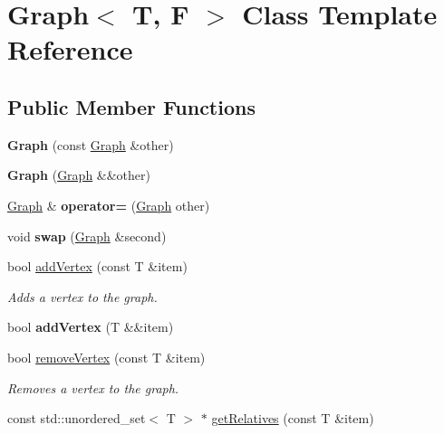 \hypertarget{class_graph}{}\section{Graph$<$ T, F $>$ Class Template Reference}
\label{class_graph}
\subsection*{Public Member Functions}
\begin{DoxyCompactItemize}
\item 
\mbox{\label{class_graph_a39aa3fc244acb59caab8ead87a490b08}} 
{\bfseries Graph} (const \hyperlink{class_graph}{Graph} \&other)
\item 
\mbox{\label{class_graph_adcc98abcaffd854bae4473287c0ec185}} 
{\bfseries Graph} (\hyperlink{class_graph}{Graph} \&\&other)
\item 
\mbox{\label{class_graph_a36fc23acaf0e5e89d9f7f54144b3f8c0}} 
\hyperlink{class_graph}{Graph} \& {\bfseries operator=} (\hyperlink{class_graph}{Graph} other)
\item 
\mbox{\label{class_graph_a427b02545efdf010462925ad5ff05726}} 
void {\bfseries swap} (\hyperlink{class_graph}{Graph} \&second)
\item 
bool \hyperlink{class_graph_a0d9a2a945cb00f2600f26ad63a4828d6}{add\+Vertex} (const T \&item)
\begin{DoxyCompactList}\small\item\em Adds a vertex to the graph. \end{DoxyCompactList}\item 
\mbox{\label{class_graph_ac65b5e08820fafb280c55bdce732f19a}} 
bool {\bfseries add\+Vertex} (T \&\&item)
\item 
bool \hyperlink{class_graph_ab60cdf74dfbd8c7682b760338fb8a952}{remove\+Vertex} (const T \&item)
\begin{DoxyCompactList}\small\item\em Removes a vertex to the graph. \end{DoxyCompactList}\item 
const std\+::unordered\+\_\+set$<$ T $>$ $\ast$ \hyperlink{class_graph_add90c1bc37771d0bf57515fd30d4c6c4}{get\+Relatives} (const T \&item)

\end{DoxyCompactItemize}
